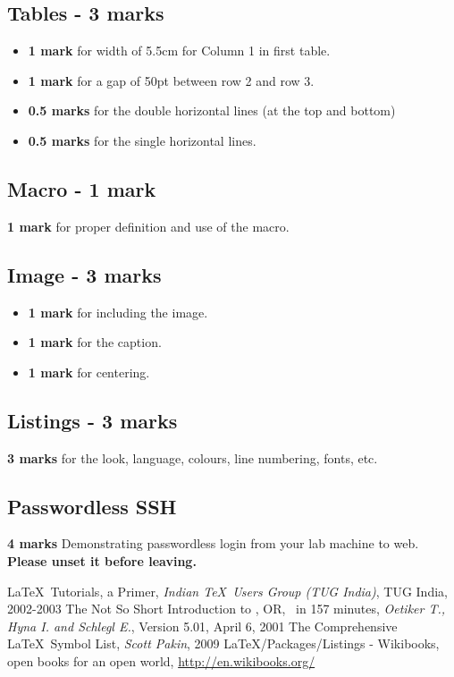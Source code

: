 \documentclass[a4paper,10pt,titlepage]{article}
\begin{document}
\subsection{Tables - 3 marks}
\begin{itemize}
 \item \textbf{1 mark} for width of 5.5cm for Column 1 in first table.
 \item \textbf{1 mark} for a gap of 50pt between row 2 and row 3.
 \item \textbf{0.5 marks} for the double horizontal lines (at the top
   and bottom)
 \item \textbf{0.5 marks} for the single horizontal lines.
\end{itemize}

\subsection{Macro - 1 mark}
\textbf{1 mark} for proper definition and use of the macro.

\subsection{Image - 3 marks}
\begin{itemize}
 \item \textbf{1 mark} for including the image.
 \item \textbf{1 mark} for the caption.
 \item \textbf{1 mark} for centering.
\end{itemize}

\subsection{Listings - 3 marks}
\textbf{3 marks} for the look, language, colours, line numbering,
fonts, etc.

\subsection{Passwordless SSH}
\textbf{4 marks} Demonstrating passwordless login from your lab
machine to web.\\
\textbf{Please unset it before leaving.}

\newpage
\begin{thebibliography}{10}
 \LaTeX\ Tutorials, a Primer, \emph{Indian \TeX\ Users Group (TUG India)}, TUG India, 2002-2003
 The Not So Short Introduction to \LaTeXe , OR, \LaTeXe\ in 157 minutes, \emph{Oetiker T.,
    Hyna I. and Schlegl E.}, Version 5.01, April 6, 2001
 The Comprehensive \LaTeX\ Symbol List, \emph{Scott Pakin}, 2009
 LaTeX/Packages/Listings - Wikibooks, open books for an open world, \url{http://en.wikibooks.org/}

\end{thebibliography}
\end{document}
